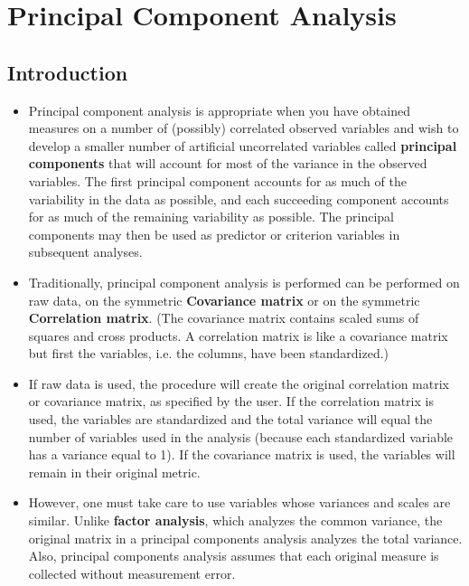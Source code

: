 \section{Principal Component Analysis }

\subsection{Introduction}
\begin{itemize}
	\item Principal component analysis is appropriate when you have obtained measures on a number of
	(possibly) correlated observed variables and wish to develop a smaller number of artificial uncorrelated variables called \textbf{principal components} that will account for most of the variance in the observed variables. The first principal component accounts for as much of the variability in the data as possible, and each succeeding component accounts for as much of the remaining variability as possible. The principal
	components may then be used as predictor or criterion variables in subsequent analyses.
	
	
\item Traditionally, principal component analysis is performed can be performed on raw data, on the symmetric \textbf{Covariance matrix} or on the symmetric \textbf{Correlation matrix}. (The covariance matrix contains scaled sums of squares and cross products. A correlation matrix is like a covariance matrix but first the variables, i.e. the columns, have been standardized.)
	
\item If raw data is used, the procedure will create the original correlation matrix or covariance matrix, as specified by the user.  If the correlation matrix is used, the variables are standardized and the total variance will equal the number of variables used in the analysis (because each standardized variable has a variance equal to 1).  If the covariance matrix is used, the variables will remain in their original metric. 
\item  However, one must take care to use variables whose variances and scales are similar.  Unlike \textbf{factor analysis}, which analyzes the common variance, the original matrix in a principal components analysis analyzes the total variance.  Also, principal components analysis assumes that each original measure is collected without measurement error.
\end{itemize}






